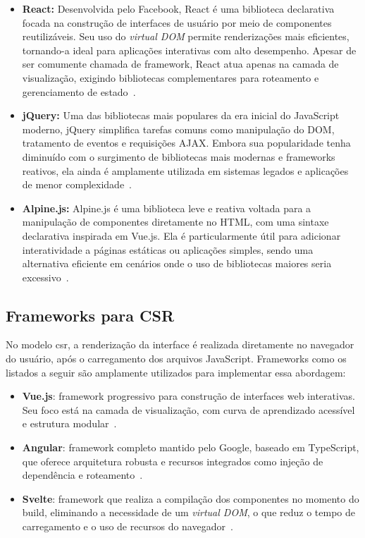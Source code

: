 \begin{itemize}
  \item \textbf{React:} Desenvolvida pelo Facebook, React é uma biblioteca declarativa focada na construção de interfaces de usuário por meio de componentes reutilizáveis. Seu uso do \textit{virtual DOM} permite renderizações mais eficientes, tornando-a ideal para aplicações interativas com alto desempenho. Apesar de ser comumente chamada de framework, React atua apenas na camada de visualização, exigindo bibliotecas complementares para roteamento e gerenciamento de estado~\cite{react2025}.

  \item \textbf{jQuery:} Uma das bibliotecas mais populares da era inicial do JavaScript moderno, jQuery simplifica tarefas comuns como manipulação do DOM, tratamento de eventos e requisições AJAX. Embora sua popularidade tenha diminuído com o surgimento de bibliotecas mais modernas e frameworks reativos, ela ainda é amplamente utilizada em sistemas legados e aplicações de menor complexidade~\cite{jquery2023}.

  \item \textbf{Alpine.js:} Alpine.js é uma biblioteca leve e reativa voltada para a manipulação de componentes diretamente no HTML, com uma sintaxe declarativa inspirada em Vue.js. Ela é particularmente útil para adicionar interatividade a páginas estáticas ou aplicações simples, sendo uma alternativa eficiente em cenários onde o uso de bibliotecas maiores seria excessivo~\cite{alpinejs2023}.
\end{itemize}

\subsection{Frameworks para CSR}
\label{subsec:frameworks-csr}

No modelo \acrshort{csr}, a renderização da interface é realizada diretamente no navegador do usuário, após o carregamento dos arquivos JavaScript. Frameworks como os listados a seguir são amplamente utilizados para implementar essa abordagem:

\begin{itemize}
    \item \textbf{Vue.js}: framework progressivo para construção de interfaces web interativas. Seu foco está na camada de visualização, com curva de aprendizado acessível e estrutura modular~\cite{vue2025}.
    
    \item \textbf{Angular}: framework completo mantido pelo Google, baseado em TypeScript, que oferece arquitetura robusta e recursos integrados como injeção de dependência e roteamento~\cite{angular2025}.
    
    \item \textbf{Svelte}: framework que realiza a compilação dos componentes no momento do build, eliminando a necessidade de um \textit{virtual DOM}, o que reduz o tempo de carregamento e o uso de recursos do navegador~\cite{svelte2025}.
\end{itemize}

